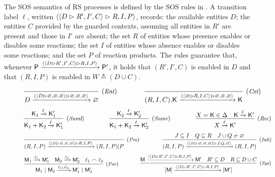 The SOS semantics of  RS processes is defined by the SOS rules in .
A transition label $\ell$, written $\langle \langle D\vartriangleright R',I',C\rangle\vartriangleright R,I,P\rangle$, records:
the available entities $D$; the entities $C$ provided by the guarded contexts, assuming all entities in $R'$ are present and those in $I'$ are absent;
the set $R$ of entities whose presence enables or disables some reactions;
the set $I$ of entities whose absence  enables or disables some reactions;
and the set $P$ of reaction products.
The  rules guarantee that, whenever $\mathsf{P}\xrightarrow{\langle \langle D\vartriangleright R',I',C\rangle\vartriangleright R,I,P\rangle} \mathsf{P}'$, it holds that $(R',I',C)$ is enabled in $D$ and that
$(R,I,P)$ is enabled in $W\triangleq (D\cup C)$.

\begin{figure*}[t]
		$$  
		\infer[(\textit{\scriptsize{Ent}})]
		{D \xrightarrow{\obs{\obs{D}{\varnothing,\varnothing,\varnothing}}{\varnothing,\varnothing,\varnothing}}\varnothing}
		{}
		\qquad\qquad
		\infer[(\textit{\scriptsize{Cxt}})]
		{(R,I,C).\mathsf{K} \xrightarrow{\obs{\obs{\varnothing}{R,I,C}}{\varnothing,\varnothing,\varnothing}}\mathsf{K}}{}
		$$
		\smallskip
		$$
		\infer[(\textit{\scriptsize Suml})]
		{\mathsf{K}_1 + \mathsf{K}_2 \xrightarrow{\ell}\mathsf{K}'_1}
		{\mathsf{K}_1 \xrightarrow{\ell}\mathsf{K}'_1}
		\qquad\qquad
		\infer[(\textit{\scriptsize Sumr})]
		{\mathsf{K}_1 + \mathsf{K}_2 \xrightarrow{\ell}\mathsf{K}'_2}
		{\mathsf{K}_2 \xrightarrow{\ell}\mathsf{K}'_2}
		\qquad\qquad
		\infer[(\textit{\scriptsize Rec})]
		{X \xrightarrow{\ell}\mathsf{K}'}
		{X=\mathsf{K}\in\Delta & \mathsf{K} \xrightarrow{\ell}\mathsf{K}'}
		$$
		\smallskip
		$$
		\infer[(\textit{\scriptsize Pro})]
		{(R,I,P)  \xrightarrow{\obs{\obs{\varnothing}{\varnothing,\varnothing,\varnothing}}{R,I,P}}(R,I,P)|P}
		{}
		\qquad\qquad
		\infer[(\textit{\scriptsize Inh})]
		{(R,I,P)  \xrightarrow{\obs{\obs{\varnothing}{\varnothing,\varnothing,\varnothing}}{J,Q,\varnothing}}(R,I,P)}
		{J \subseteq I & Q \subseteq R & J\cup Q\neq \varnothing}
		$$
		\smallskip
		$$
		\infer[(\textit{\scriptsize Par})]
		{\mathsf{M}_1~|~\mathsf{M}_2\xrightarrow{\ell_1\cup\ell_2} \mathsf{M}'_1~|~\mathsf{M}'_2}
		{\mathsf{M}_1 \xrightarrow{\ell_1} \mathsf{M}'_1 &
		\mathsf{M}_2 \xrightarrow{\ell_2} \mathsf{M}'_2 &
			\ell_1\frown \ell_2 }
		\qquad\qquad
		\infer[(\textit{\scriptsize Sys})]
		{[\mathsf{M}]\xrightarrow{\obs{\obs{D}{R',I',C}}{R,I,P}} [\mathsf{M}']}
		{\mathsf{M}\xrightarrow{\obs{\obs{D}{R',I',C}}{R,I,P}} \mathsf{M}' &
		R'\subseteq D &
        R\subseteq D\cup C}
		$$


\end{figure*}
